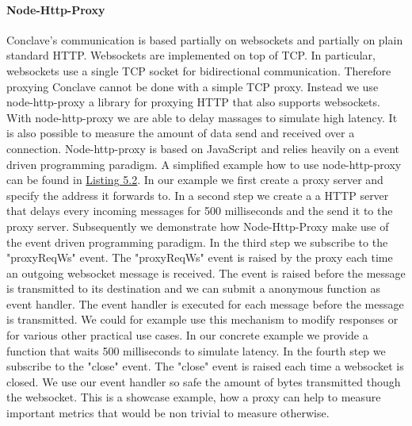  \paragraph{Node-Http-Proxy}
 Conclave's communication is based partially on websockets and partially on plain standard HTTP.
 Websockets are implemented on top of TCP. In particular, websockets use a single TCP socket for bidirectional communication. Therefore proxying Conclave cannot be done with a simple TCP proxy. Instead we use node-http-proxy a library for proxying HTTP that also supports websockets. With node-http-proxy we are able to delay massages to simulate high latency. It is also possible to measure the amount of data send and received over a connection.
 Node-http-proxy is based on JavaScript and relies heavily on a event driven programming paradigm. A simplified example how to use node-http-proxy can be found in \hyperref[the_label]{Listing 5.2}. In our example we first create a proxy server and specify the address it forwards to. In a second step we create a a HTTP server that delays every incoming messages for 500 milliseconds and the send it to the proxy server. Subsequently we demonstrate how Node-Http-Proxy make use of the event driven programming paradigm. In the third step we subscribe to the "proxyReqWs" event. The "proxyReqWs" event is raised by the proxy each time an outgoing websocket message is received. The event is raised before the message is transmitted to its destination and we can submit a anonymous function as event handler. The event handler is executed for each message before the message is transmitted. We could for example use this mechanism to modify responses or for various other practical use cases. In our concrete example
 we provide a function that waits 500 milliseconds to simulate latency. In the fourth step we subscribe to the "close" event. The "close" event is raised each time a websocket is closed. We use our event handler so safe the amount of bytes transmitted though the websocket. This is a showcase example, how a proxy can help to measure important metrics that would be non trivial to  measure otherwise.
  \label{the_label}				
